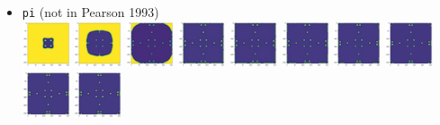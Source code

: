 \begin{itemize}
\item {\tt pi} (not in Pearson 1993)\\
\includegraphics[width=1.4cm]{python_codes/fieldstone_171/pearson93/pi_solution_0001000_u}
\includegraphics[width=1.4cm]{python_codes/fieldstone_171/pearson93/pi_solution_0005000_u}
\includegraphics[width=1.4cm]{python_codes/fieldstone_171/pearson93/pi_solution_0010000_u}
\includegraphics[width=1.4cm]{python_codes/fieldstone_171/pearson93/pi_solution_0015000_u}
\includegraphics[width=1.4cm]{python_codes/fieldstone_171/pearson93/pi_solution_0020000_u}
\includegraphics[width=1.4cm]{python_codes/fieldstone_171/pearson93/pi_solution_0030000_u}
\includegraphics[width=1.4cm]{python_codes/fieldstone_171/pearson93/pi_solution_0040000_u}
\includegraphics[width=1.4cm]{python_codes/fieldstone_171/pearson93/pi_solution_0050000_u}
\includegraphics[width=1.4cm]{python_codes/fieldstone_171/pearson93/pi_solution_0075000_u}
\includegraphics[width=1.4cm]{python_codes/fieldstone_171/pearson93/pi_solution_final_u}


\end{itemize}
